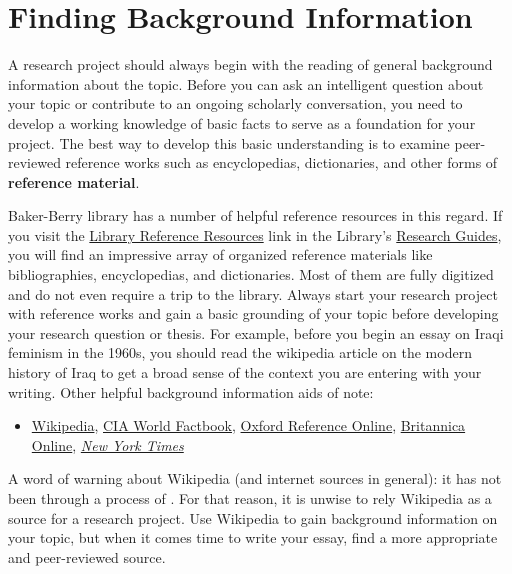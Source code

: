 \section{Finding Background Information}

A research project should always begin with the reading of general background
information about the topic. Before you can ask an intelligent question about
your topic or contribute to an ongoing scholarly conversation, you need to
develop a working knowledge of basic facts to serve as a foundation for your
project. The best way to develop this basic understanding is to examine
peer-reviewed reference works such as encyclopedias, dictionaries, and other
forms of \textbf{reference material}.

Baker-Berry library has a number of helpful reference resources in this regard.
If  you visit the  \href{http://researchguides.dartmouth.edu/reference}{Library Reference Resources} link in the Library's \href{http://researchguides.dartmouth.edu/}{Research Guides}, you
will find an impressive array of organized reference materials like
bibliographies, encyclopedias, and dictionaries. Most of them are fully
digitized and do not even require a trip to the library. Always start your
research project with reference works and gain a basic grounding of your topic
before developing your research question or thesis. For example, before you begin an essay on 
Iraqi feminism in the 1960s, you should read the wikipedia article on the modern history of Iraq to get
a broad sense of the context you are entering with your writing. Other helpful background information aids of note:

\begin{itemize}

\item \href{http://www.wikipedia.org}{Wikipedia}, \href{https://www.cia.gov/library/publications/the-world-factbook/}{CIA World Factbook}, \href{http://www.oxfordreference.com/}{Oxford Reference  Online}, \href{http://www.search.eb.com/}{Britannica Online}, \href{https://search.library.dartmouth.edu/discovery/jfulldisplay?docid=alma991033334807305706&context=L&vid=01DCL_INST:01DCL&search_scope=jsearch_scope&tab=jsearch_slot&lang=en}{\emph{New York Times}}

\end{itemize}

A word of warning about Wikipedia (and internet sources in
general): it has not  been through a process of \hyperlink{peer-review}{\color{Ahrenge}{peer review}}. For that
reason, it is unwise to rely  Wikipedia as a source for a research project. Use
Wikipedia to gain background information on your topic, but when it comes time
to write your essay, find a more appropriate and peer-reviewed source.

